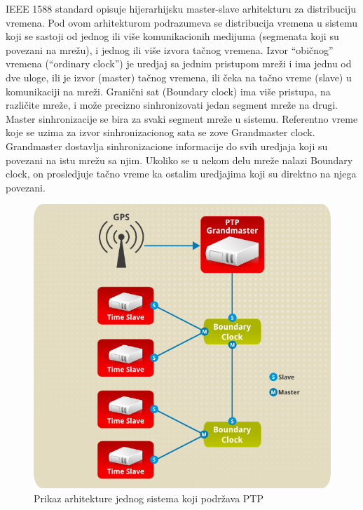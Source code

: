 \documentclass[a4paper,12pt, master]{etf}
\begin{document}
	IEEE 1588 standard opisuje hijerarhijsku master-slave arhitekturu za
	distribuciju vremena. Pod ovom arhitekturom podrazumeva se distribucija
	vremena u sistemu koji se sastoji od jednog ili vi\v{s}e komunikacionih
	medijuma (segmenata koji su povezani na mre\v{z}u), i jednog ili vi\v{s}e
	izvora ta\v{c}nog vremena. Izvor ``obi\v{c}nog'' vremena (``ordinary
    clock'') je uredjaj sa jednim pristupom mre\v{z}i i ima jednu od dve uloge,
    ili je izvor (master) ta\v{c}nog vremena, ili \v{c}eka na ta\v{c}no vreme
    (slave) u komunikaciji na mre\v{z}i. Grani\v{c}ni sat (Boundary clock) ima
    vi\v{s}e pristupa, na razli\v{c}ite mre\v{z}e, i mo\v{z}e precizno
    sinhronizovati jedan segment mre\v{z}e na drugi. Master sinhronizacije se
    bira za svaki segment mre\v{z}e u sistemu. Referentno vreme koje se uzima za
	izvor sinhronizacionog sata se zove Grandmaster clock. Grandmaster dostavlja
    sinhronizacione informacije do svih uredjaja koji su povezani na istu
    mre\v{z}u sa njim. Ukoliko se u nekom delu mre\v{z}e nalazi Boundary clock,
    on prosledjuje ta\v{c}no vreme ka ostalim uredjajima koji su direktno na
    njega povezani.

	\begin{figure}[htb]
			\centering
			\includegraphics[scale=.3]{../pic/arch_ptp_system.png}
            \caption{Prikaz arhitekture jednog sistema koji podr\v{z}ava PTP}
			\label{fig:arch_ptp_system}
	\end{figure}
\end{document}
